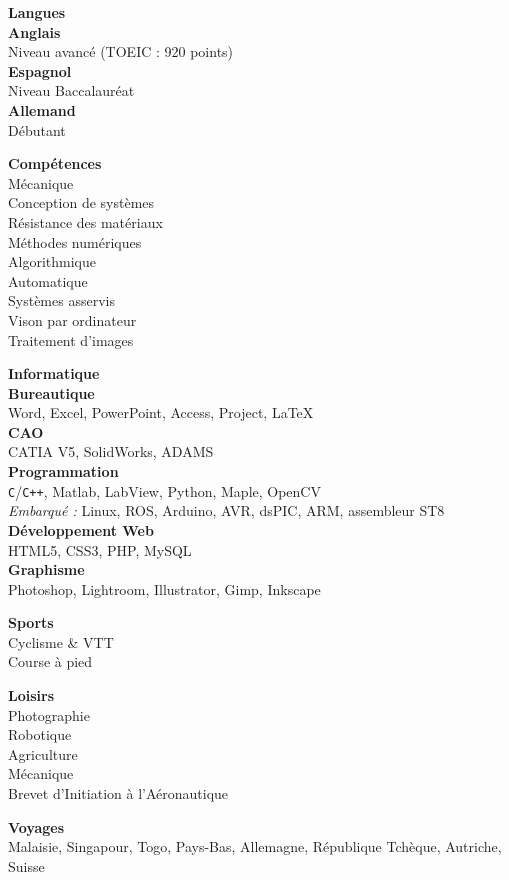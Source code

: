 \documentclass[a4paper,11pt,final]{memoir}
\newcommand{\Sep}{\vspace{1.5em}}
\newcommand{\SmallSep}{\vspace{0.5em}}
\newcommand{\SkillSection}[1]
	{\small{\textbf{#1\\}}\normalfont\footnotesize}
\newcommand{\SkillItem}[1]
	{\textbf{\color{RoyalBlue} #1}\normalfont\\}
\begin{document}
\begin{flushleft}
\SkillSection{Langues}
\SkillItem{Anglais}
Niveau avancé (TOEIC : 920 points)\\
\SkillItem{Espagnol}
Niveau Baccalauréat\\
\SkillItem{Allemand}
Débutant
\Sep

\SkillSection{Compétences}
Mécanique\\
Conception de systèmes\\
Résistance des matériaux\\
Méthodes numériques\\
Algorithmique\\
Automatique\\
Systèmes asservis\\
Vison par ordinateur\\
Traitement d'images
\Sep

\SkillSection{Informatique}
\SkillItem{Bureautique}
Word, Excel, PowerPoint, Access, Project, \LaTeX\\
\SkillItem{CAO}
CATIA V5, SolidWorks, ADAMS\\
\SkillItem{Programmation}
\verb!C!/\verb!C++!, Matlab, LabView, Python, Maple, OpenCV\\
\emph{Embarqué :} Linux, ROS, Arduino, AVR, dsPIC, ARM, assembleur ST8\\
\SkillItem{Développement Web}
HTML5, CSS3, PHP, MySQL\\
\SkillItem{Graphisme}
Photoshop, Lightroom, Illustrator, Gimp, Inkscape\\
\Sep

\SkillSection{Sports}
Cyclisme \& VTT\\
Course à pied\\
\SmallSep

\SkillSection{Loisirs}
Photographie\\
Robotique\\
Agriculture\\
Mécanique\\
Brevet d'Initiation à l'Aéronautique
\SmallSep

\SkillSection{Voyages}
Malaisie, Singapour, Togo, Pays-Bas, Allemagne, République Tchèque, Autriche, Suisse
\end{flushleft}
\framebreak
\end{document}
